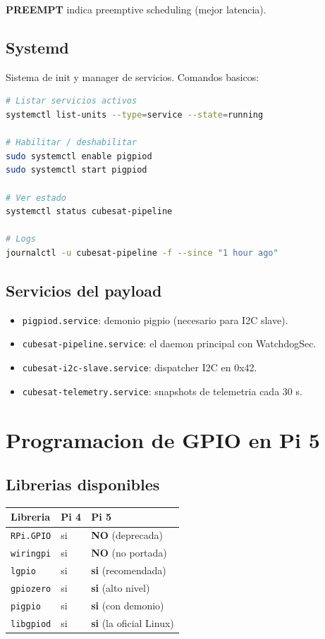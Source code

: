 \documentclass[11pt,a4paper,oneside]{report}
\begin{document}
\textbf{PREEMPT} indica preemptive scheduling (mejor latencia).

\section{Systemd}

Sistema de init y manager de servicios. Comandos basicos:

\begin{lstlisting}[language=bash]
# Listar servicios activos
systemctl list-units --type=service --state=running

# Habilitar / deshabilitar
sudo systemctl enable pigpiod
sudo systemctl start pigpiod

# Ver estado
systemctl status cubesat-pipeline

# Logs
journalctl -u cubesat-pipeline -f --since "1 hour ago"
\end{lstlisting}

\section{Servicios del payload}

\begin{itemize}[leftmargin=2em]
  \item \texttt{pigpiod.service}: demonio pigpio (necesario para I2C slave).
  \item \texttt{cubesat-pipeline.service}: el daemon principal con WatchdogSec.
  \item \texttt{cubesat-i2c-slave.service}: dispatcher I2C en 0x42.
  \item \texttt{cubesat-telemetry.service}: snapshots de telemetria cada 30 s.
\end{itemize}

\chapter{Programacion de GPIO en Pi 5}

\section{Librerias disponibles}

\begin{center}
\begin{tabular}{lll}
\toprule
\textbf{Libreria} & \textbf{Pi 4} & \textbf{Pi 5} \\
\midrule
\texttt{RPi.GPIO}     & si  & \textbf{NO} (deprecada) \\
\texttt{wiringpi}     & si  & \textbf{NO} (no portada) \\
\texttt{lgpio}        & si  & \textbf{si} (recomendada) \\
\texttt{gpiozero}     & si  & \textbf{si} (alto nivel) \\
\texttt{pigpio}       & si  & \textbf{si} (con demonio) \\
\texttt{libgpiod}     & si  & \textbf{si} (la oficial Linux) \\
\bottomrule
\end{tabular}
\end{center}
\end{document}
